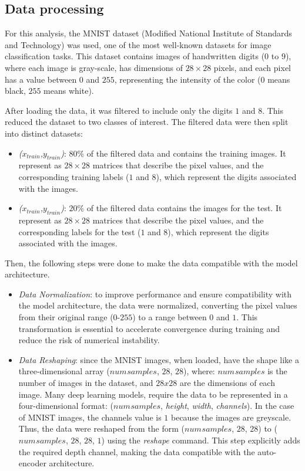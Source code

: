 \documentclass[9pt,technote]{IEEEtran}
\begin{document}
\subsection{Data processing}
For this analysis, the MNIST dataset (Modified National Institute of Standards and Technology) was used, one of the most well-known datasets for image classification tasks. This dataset contains images of handwritten digits ($0$ to $9$), where each image is gray-scale, has dimensions of $28\times28$ pixels, and each pixel has a value between $0$ and $255$, representing the intensity of the color ($0$ means black, $255$ means white).

After loading the data, it was filtered to include only the digits $1$ and $8$. This reduced the dataset to two classes of interest. The filtered data were then split into distinct datasets: 
\begin{itemize}
	\item \textit{($x_{train}$,$y_{train}$)}:  $80\%$ of the filtered data and contains the training images. It represent as $28\times28$ matrices that describe the pixel values, and the corresponding training labels ($1$ and $8$), which represent the digits associated with the images.
	\item \textit{($x_{train}$,$y_{train}$)}: $20\%$ of the filtered data contains the images for the test. It represent as $28\times28$ matrices that describe the pixel values, and the corresponding labels for the test ($1$ and $8$), which represent the digits associated with the images.
\end{itemize}
Then, the following steps were done to make the data compatible with the model architecture.
\begin{itemize}
	\item \textit{Data Normalization}: to improve performance and ensure compatibility with the model architecture, the data were normalized, converting the pixel values from their original range ($0$-$255$) to a range between $0$ and $1$. This transformation is essential to accelerate convergence during training and reduce the risk of numerical instability.
	\item \textit{Data Reshaping}: since the MNIST images, when loaded, have the shape like a three-dimensional array (\textit{$num_{}samples$}, $28$, $28$), where: \textit{$num_{}samples$} is the number of images in the dataset, and $28x28$ are the dimensions of each image.
	Many deep learning models, require the data to be represented in a four-dimensional format: (\textit{$num_{}samples$}, \textit{height}, \textit{width}, \textit{channels}). In the case of MNIST images, the channels value is $1$ because the images are greyscale.
	Thus, the data were reshaped from the form (\textit{$num_{}samples$}, $28$, $28$) to (\textit{$num_{}samples$}, $28$, $28$, $1$) using the \textit{reshape} command. This step explicitly adds the required depth channel, making the data compatible with the auto-encoder architecture.
\end{itemize}
\end{document}
